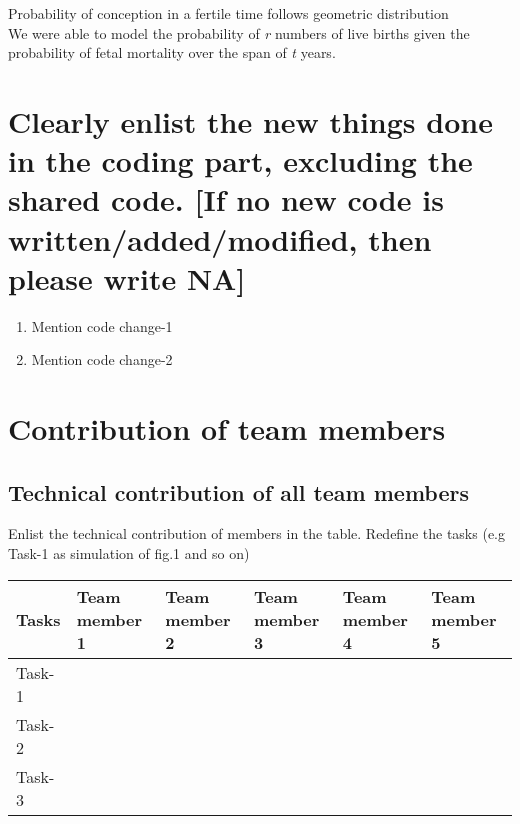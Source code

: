 \documentclass{article}
\begin{document}
Probability of conception in a fertile time follows geometric distribution\\


We were able to model the probability of {\itshape r} numbers of live births given the probability of fetal mortality over the span of {\itshape t} years.


\section{Clearly enlist the new things done in the coding part, excluding the shared code. [If no new code is written/added/modified, then please write NA]}

\begin{enumerate}
    \item Mention code change-1
    \item Mention code change-2
\end{enumerate}



\section{Contribution of team members}	
\subsection{Technical contribution of all team members }
Enlist the technical contribution of members in the table. Redefine the tasks (e.g Task-1 as simulation of fig.1 and so on)
\begin{table}[h]
\centering
\begin{tabular}{|l|l|l|l|l|l|}
\hline
Tasks  & Team member 1 & Team member 2 & Team member 3 & Team member 4 & Team member 5 \\ \hline
Task-1 &               &               &               &               &               \\ \hline
Task-2 &               &               &               &               &               \\ \hline
Task-3 &               &               &               &               &               \\ \hline
\end{tabular}
\end{table}
\end{document}
